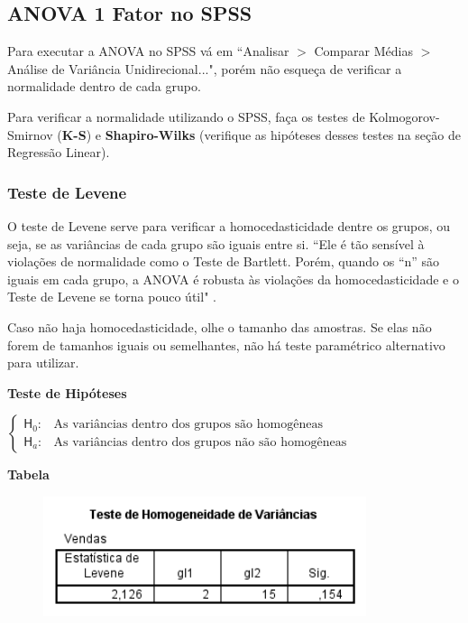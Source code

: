 	\subsection{ANOVA 1 Fator no SPSS \cite{torres}}

		Para executar a ANOVA no SPSS vá em ``Analisar $>$ Comparar Médias $>$ Análise de Variância Unidirecional...", porém não esqueça de verificar a normalidade dentro de cada grupo.

		Para verificar a normalidade utilizando o SPSS, faça os testes de Kolmogorov-Smirnov (\textbf{K-S}) e \textbf{Shapiro-Wilks} (verifique as hipóteses desses testes na seção de Regressão Linear).

		\subsubsection{Teste de Levene}

			O teste de Levene serve para verificar a homocedasticidade dentre os grupos, ou seja, se as variâncias de cada grupo são iguais entre si. ``Ele é tão sensível à violações de normalidade como o Teste de Bartlett. Porém, quando os “n” são iguais em cada grupo, a ANOVA é robusta às violações da homocedasticidade e o Teste de Levene se torna pouco útil" \cite{torres}.

			Caso não haja homocedasticidade, olhe o tamanho das amostras. Se elas não forem de tamanhos iguais ou semelhantes, não há teste paramétrico alternativo para utilizar.

			\bigskip

			\textbf{Teste de Hipóteses}

					\bigskip

					$
					\begin{cases}
						\mathsf{H}_{0} : & \text{As variâncias dentro dos grupos são homogêneas} \\
						\mathsf{H}_{a} : & \text{As variâncias dentro dos grupos não são homogêneas}
					\end{cases}
					$
			
			\bigskip \bigskip
			
			\textbf{Tabela}
			
				\begin{figure}[H]
					\centering			
					\includegraphics[height=3.5cm]{images/anova_levene}
				\end{figure}
				
